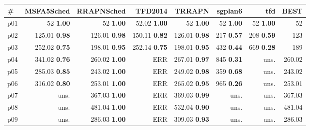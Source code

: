 \begin{tabular}{lrrrrrrr}
\toprule
\textbf{\#} & \textbf{MSFA5Sched} & \textbf{RRAPNSched} & \textbf{TFD2014} & \textbf{TRRAPN} & \textbf{sgplan6} & \textbf{tfd} & \textbf{BEST}\\
\midrule
\multicolumn{1}{l|}{p01} & {\footnotesize 52} \textbf{1.00} & {\footnotesize 52} \textbf{1.00} & {\footnotesize 52.02} \textbf{1.00} & {\footnotesize 52} \textbf{1.00} & {\footnotesize 52} \textbf{1.00} & {\footnotesize 52} \textbf{1.00} & \multicolumn{1}{|r}{52}\\
\multicolumn{1}{l|}{p02} & {\footnotesize 125.01} \textbf{0.98} & {\footnotesize 126.01} \textbf{0.98} & {\footnotesize 150.11} \textbf{0.82} & {\footnotesize 126.01} \textbf{0.98} & {\footnotesize 217} \textbf{0.57} & {\footnotesize 208} \textbf{0.59} & \multicolumn{1}{|r}{123}\\
\multicolumn{1}{l|}{p03} & {\footnotesize 252.02} \textbf{0.75} & {\footnotesize 198.01} \textbf{0.95} & {\footnotesize 252.14} \textbf{0.75} & {\footnotesize 198.01} \textbf{0.95} & {\footnotesize 432} \textbf{0.44} & {\footnotesize 669} \textbf{0.28} & \multicolumn{1}{|r}{189}\\
\multicolumn{1}{l|}{p04} & {\footnotesize 341.02} \textbf{0.76} & {\footnotesize 260.02} \textbf{1.00} & ERR & {\footnotesize 267.01} \textbf{0.97} & {\footnotesize 845} \textbf{0.31} & uns. & \multicolumn{1}{|r}{260.02}\\
\multicolumn{1}{l|}{p05} & {\footnotesize 285.03} \textbf{0.85} & {\footnotesize 243.02} \textbf{1.00} & ERR & {\footnotesize 249.02} \textbf{0.98} & {\footnotesize 359} \textbf{0.68} & uns. & \multicolumn{1}{|r}{243.02}\\
\multicolumn{1}{l|}{p06} & {\footnotesize 316.02} \textbf{0.80} & {\footnotesize 253.01} \textbf{1.00} & ERR & {\footnotesize 265.02} \textbf{0.95} & {\footnotesize 965} \textbf{0.26} & uns. & \multicolumn{1}{|r}{253.01}\\
\multicolumn{1}{l|}{p07} & uns. & {\footnotesize 367.03} \textbf{1.00} & ERR & {\footnotesize 369.03} \textbf{0.99} & uns. & uns. & \multicolumn{1}{|r}{367.03}\\
\multicolumn{1}{l|}{p08} & uns. & {\footnotesize 481.04} \textbf{1.00} & ERR & {\footnotesize 532.04} \textbf{0.90} & uns. & uns. & \multicolumn{1}{|r}{481.04}\\
\multicolumn{1}{l|}{p09} & uns. & {\footnotesize 286.03} \textbf{1.00} & ERR & {\footnotesize 309.03} \textbf{0.93} & uns. & uns. & \multicolumn{1}{|r}{286.03}\\

\end{tabular}
